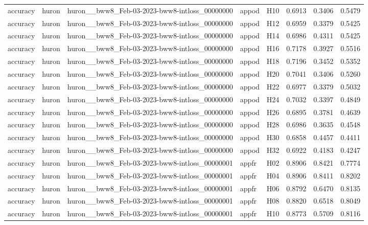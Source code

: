 \begin{table}[tbp]
\begin{tabular}{lllllrrr}
accuracy & huron & huron\_\_bww8\_Feb-03-2023-bww8-intloss\_00000000 & appod & H10 & 0.6913 & 0.3406 & 0.5479 \\
accuracy & huron & huron\_\_bww8\_Feb-03-2023-bww8-intloss\_00000000 & appod & H12 & 0.6959 & 0.3379 & 0.5425 \\
accuracy & huron & huron\_\_bww8\_Feb-03-2023-bww8-intloss\_00000000 & appod & H14 & 0.6986 & 0.4311 & 0.5425 \\
accuracy & huron & huron\_\_bww8\_Feb-03-2023-bww8-intloss\_00000000 & appod & H16 & 0.7178 & 0.3927 & 0.5516 \\
accuracy & huron & huron\_\_bww8\_Feb-03-2023-bww8-intloss\_00000000 & appod & H18 & 0.7196 & 0.3452 & 0.5352 \\
accuracy & huron & huron\_\_bww8\_Feb-03-2023-bww8-intloss\_00000000 & appod & H20 & 0.7041 & 0.3406 & 0.5260 \\
accuracy & huron & huron\_\_bww8\_Feb-03-2023-bww8-intloss\_00000000 & appod & H22 & 0.6977 & 0.3379 & 0.5032 \\
accuracy & huron & huron\_\_bww8\_Feb-03-2023-bww8-intloss\_00000000 & appod & H24 & 0.7032 & 0.3397 & 0.4849 \\
accuracy & huron & huron\_\_bww8\_Feb-03-2023-bww8-intloss\_00000000 & appod & H26 & 0.6895 & 0.3781 & 0.4639 \\
accuracy & huron & huron\_\_bww8\_Feb-03-2023-bww8-intloss\_00000000 & appod & H28 & 0.6986 & 0.3635 & 0.4548 \\
accuracy & huron & huron\_\_bww8\_Feb-03-2023-bww8-intloss\_00000000 & appod & H30 & 0.6858 & 0.4457 & 0.4411 \\
accuracy & huron & huron\_\_bww8\_Feb-03-2023-bww8-intloss\_00000000 & appod & H32 & 0.6922 & 0.4183 & 0.4247 \\
accuracy & huron & huron\_\_bww8\_Feb-03-2023-bww8-intloss\_00000001 & appfr & H02 & 0.8906 & 0.8421 & 0.7774 \\
accuracy & huron & huron\_\_bww8\_Feb-03-2023-bww8-intloss\_00000001 & appfr & H04 & 0.8906 & 0.8411 & 0.8202 \\
accuracy & huron & huron\_\_bww8\_Feb-03-2023-bww8-intloss\_00000001 & appfr & H06 & 0.8792 & 0.6470 & 0.8135 \\
accuracy & huron & huron\_\_bww8\_Feb-03-2023-bww8-intloss\_00000001 & appfr & H08 & 0.8820 & 0.6518 & 0.8049 \\
accuracy & huron & huron\_\_bww8\_Feb-03-2023-bww8-intloss\_00000001 & appfr & H10 & 0.8773 & 0.5709 & 0.8116 \\

\end{tabular}
\end{table}
